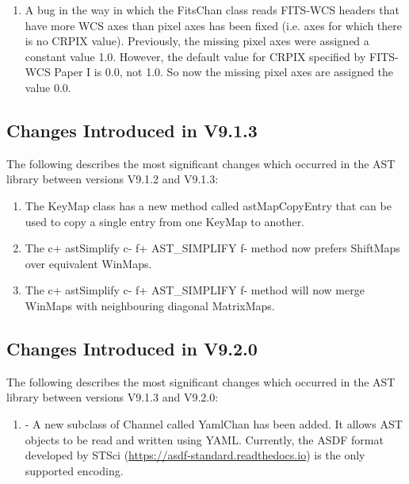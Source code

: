 \documentclass[twoside,11pt]{starlink}
\begin{document}
\begin{enumerate}

\item A bug in the way in which the FitsChan class reads FITS-WCS headers
that have more WCS axes than pixel axes has been fixed (i.e. axes for
which there is no CRPIX value). Previously, the missing pixel axes were
assigned a constant value 1.0. However, the default value for CRPIX
specified by FITS-WCS Paper I is 0.0, not 1.0. So now the missing pixel
axes are assigned the value 0.0.

\end{enumerate}

\subsection{Changes Introduced in V9.1.3}
The following describes the most significant changes which
occurred in the AST library between versions V9.1.2 and V9.1.3:

\begin{enumerate}

\item The KeyMap class has a new method called astMapCopyEntry that can be used
to copy a single entry from one KeyMap to another.

\item The
c+
astSimplify
c-
f+
AST\_SIMPLIFY
f-
method now prefers ShiftMaps over equivalent WinMaps.

\item The
c+
astSimplify
c-
f+
AST\_SIMPLIFY
f-
method will now merge WinMaps with neighbouring diagonal MatrixMaps.


\end{enumerate}

\subsection{Changes Introduced in V9.2.0}
The following describes the most significant changes which
occurred in the AST library between versions V9.1.3 and V9.2.0:

\begin{enumerate}

\item - A new subclass of Channel called YamlChan has been added. It allows AST
objects to be read and written using YAML. Currently, the ASDF format
developed by STSci (\url{https://asdf-standard.readthedocs.io}) is the only
supported encoding.

\end{enumerate}
\end{document}
